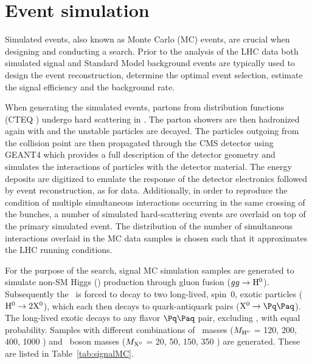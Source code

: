 \section{Event simulation}

Simulated events, also known as Monte Carlo (MC) events, are crucial when 
designing and conducting a search. Prior to the analysis of the LHC data 
both simulated signal and Standard Model background events
are typically used to design the event reconstruction, determine the optimal 
event selection, estimate the signal efficiency and the background rate.

When generating the simulated events, partons from distribution functions 
(CTEQ \cite{Bourilkov:2006cj}) undergo hard scattering in \PYTHIA \cite{PYTHIA}. 
The parton showers are then hadronized again with \PYTHIA and the unstable particles are decayed.
The particles outgoing from the collision point are then propagated through the CMS detector 
using GEANT4 \cite{GEANT4} which provides a full description of the detector geometry
and simulates
the interactions of particles with the detector material. The energy deposits are digitized
to emulate the response of the detector electronics followed by event reconstruction,
as for data. Additionally, in order to reproduce the 
condition of multiple simultaneous interactions occurring in the same crossing of the 
bunches, a number of simulated hard-scattering events are overlaid on top of the primary 
simulated event. The distribution of the number of simultaneous interactions overlaid in the
MC data samples is chosen such that it approximates the LHC running conditions.

For the purpose of the search, signal MC simulation samples are generated to
simulate non-SM Higgs (\Higgs) production through gluon fusion ($gg \to \mathrm{H}^{0}$). 
Subsequently the \Higgs~is forced to decay to two long-lived, spin~0, exotic particles
($\mathrm{H}^{0} \to 2\mathrm{X^{0}}$), which each then decays to quark-antiquark pairs ($\X \to \qq$).
The long-lived exotic \X decays to any flavor $\qq$ pair, excluding \ttbar, with equal probability. Samples
with different combinations of \Higgs~masses ($M_{\mathrm{H}^{0}}$ = 120, 200, 400, 1000 \GeV ) and \X~boson masses
($M_{\mathrm{X^{0}}}$ = 20, 50, 150, 350 \GeV) are generated. These are listed in Table~\ref{tab:signalMC}.

